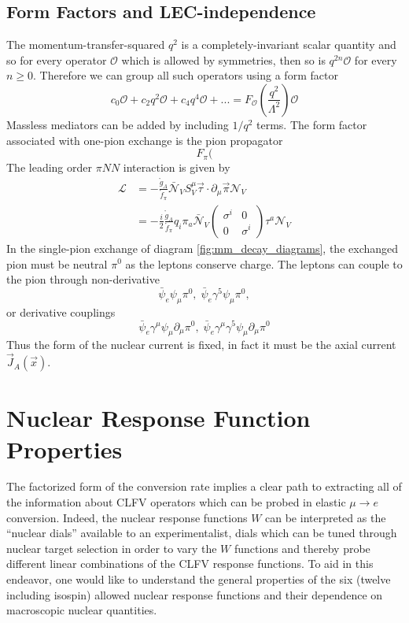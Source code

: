 \documentclass{book}[12pt]
\begin{document}
\section{Form Factors and LEC-independence}
The momentum-transfer-squared $q^2$ is a completely-invariant scalar quantity and so for every operator $\mathcal{O}$ which is allowed by symmetries, then so is $q^{2n}\mathcal{O}$ for every $n\geq 0$. Therefore we can group all such operators using a form factor
\begin{equation}
c_0\mathcal{O}+c_2 q^2\mathcal{O}+c_4q^4\mathcal{O}+...=F_{\mathcal{O}}\left(\frac{q^2}{\Lambda^2}\right)\mathcal{O}
\end{equation}
Massless mediators can be added by including $1/q^2$ terms. The form factor associated with one-pion exchange is the pion propagator
\begin{equation}
F_{\pi}(
\end{equation}
The leading order $\pi NN$ interaction is given by
\begin{equation}
\begin{split}
\mathcal{L}&=-\frac{\mathring{g}_A}{\mathring{f}_{\pi}}\bar{\mathcal{N}}_V S^{\mu}_V\vec{\tau}\cdot\partial_{\mu}\vec{\pi}\mathcal{N}_V\\
&=-\frac{i}{2}\frac{\mathring{g}_A}{\mathring{f}_{\pi}}q_i\pi_a\bar{\mathcal{N}}_V\left(\begin{array}{cc}
\sigma^i & 0 \\
0 & \sigma^i
\end{array}\right)\tau^a\mathcal{N}_V
\end{split}
\end{equation}
In the single-pion exchange of diagram \ref{fig:mm_decay_diagrams}, the exchanged pion must be neutral $\pi^0$ as the leptons conserve charge. The leptons can couple to the pion through non-derivative 
\begin{equation}
\bar{\psi}_e\psi_{\mu}\pi^0,\;\bar{\psi}_e\gamma^5\psi_{\mu}\pi^0,
\end{equation}
or derivative couplings
\begin{equation}
\bar{\psi}_e\gamma^{\mu}\psi_{\mu}\partial_{\mu}\pi^0,\;\bar{\psi}_e\gamma^{\mu}\gamma^5\psi_{\mu}\partial_{\mu}\pi^0
\end{equation}
Thus the form of the nuclear current is fixed, in fact it must be the axial current $\vec{J}_A(\vec{x})$.
\chapter{Nuclear Response Function Properties}
The factorized form of the conversion rate implies a clear path to extracting all of the information about CLFV operators which can be probed in elastic $\mu\rightarrow e$ conversion. Indeed, the nuclear response functions $W$ can be interpreted as the ``nuclear dials'' available to an experimentalist, dials which can be tuned through nuclear target selection in order to vary the $W$ functions and thereby probe different linear combinations of the CLFV response functions. To aid in this endeavor, one would like to understand the general properties of the six (twelve including isospin) allowed nuclear response functions and their dependence on macroscopic nuclear quantities.
\end{document}
